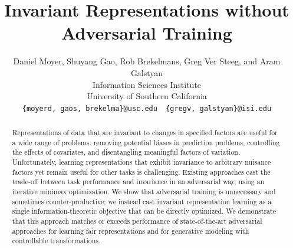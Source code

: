 \documentclass{article}
\title{Invariant Representations without Adversarial Training}
\author{
  Daniel Moyer, Shuyang Gao, Rob Brekelmans, Greg Ver Steeg, and Aram Galstyan\\
  Information Sciences Institute\\
  University of Southern California\\
  \texttt{\{moyerd, gaos, brekelma\}@usc.edu~~\{gregv, galstyan\}@isi.edu} \\
}
\begin{document}

\maketitle

\begin{abstract}
Representations of data that are invariant to changes in specified factors are useful for a wide range of problems: removing potential biases in prediction problems, controlling the effects of covariates, and disentangling meaningful factors of variation. Unfortunately, learning representations that exhibit invariance to arbitrary nuisance factors yet remain useful for other tasks is challenging. Existing approaches cast the trade-off between task performance and invariance in an adversarial way, using an iterative minimax optimization. We show that adversarial training is unnecessary and sometimes counter-productive; we instead cast invariant representation learning as a single information-theoretic objective that can be directly optimized. We demonstrate that this approach matches or exceeds performance of state-of-the-art adversarial approaches for learning fair representations and for generative modeling with controllable transformations.
\end{abstract}











\end{document}

